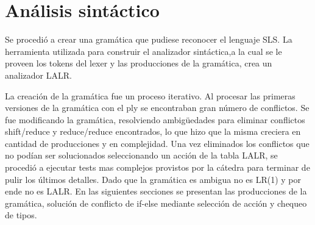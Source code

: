 \section{Análisis sintáctico}

Se procedió a crear una gramática que pudiese reconocer el lenguaje SLS. 
La herramienta utilizada para construir el analizador sintáctica,a la cual se le proveen los tokens del lexer y las producciones de la gramática, crea un analizador LALR. 

La creación de la gramática fue un proceso iterativo. Al procesar las primeras versiones de la gramática con el ply se encontraban gran número de conflictos. Se fue modificando la gramática, resolviendo ambigüedades para eliminar conflictos shift/reduce y reduce/reduce encontrados, lo que hizo que la misma creciera en cantidad de producciones y en complejidad.
Una vez eliminados los conflictos que no podían ser solucionados seleccionando un acción  de la tabla LALR, se procedió a ejecutar tests mas complejos provistos por la cátedra para terminar de pulir los últimos detalles. Dado que la gramática es ambigua no es LR(1) y por ende no es LALR. 
    En las siguientes secciones se presentan las producciones de la gramática, solución de conflicto de if-else mediante selección de acción y chequeo de tipos. 
    

